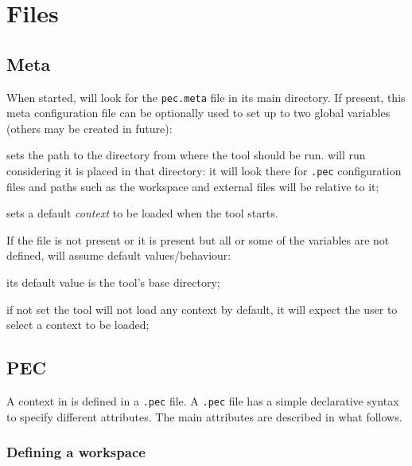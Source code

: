 
\chapter{Files}


\section{Meta}\label{sec:pec.meta}

When started, \PET will look for the {\tt pec.meta} file in its main directory.
If present, this meta configuration file can be optionally used to set up to two global variables (others may be created in future):

\begin{description}
	\setlength\itemindent{0.5cm}  
	\item[\tt \param{dir}{path}] sets the path to the directory from where the tool should be run. \PET will run considering it is placed in that directory: it will look there for {\tt .pec} configuration files and paths such as the workspace and external files will be relative to it;
	\item[\tt \param{default}{pec}] sets a default {\it context} to be loaded when the tool starts. 
\end{description}

If the file is not present or it is present but all or some of the variables are not defined, \PET will assume default values/behaviour:

\begin{description}
	\setlength\itemindent{0.5cm}  
	\item[\tt dir] its default value is the tool's base directory;
	\item[\tt default] if not set the tool will not load any context by default, it will expect the user to select a context to be loaded;
\end{description}


\section{PEC}\label{sec:pec}

A context in \PET is defined in a {\tt .pec} file.
A {\tt .pec} file has a simple declarative syntax to specify different attributes. The main attributes are described in what follows.

\subsection{Defining a workspace}

